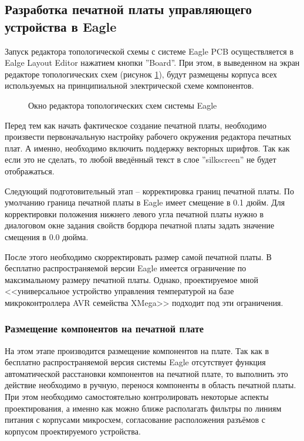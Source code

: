 \subsection{Разработка печатной платы управляющего устройства в Eagle}
Запуск редактора топологической схемы с системе Eagle PCB осуществляется в Ealge Layout Editor
нажатием кнопки ''Board''.  При этом, в выведенном на экран редакторе топологических
схем (рисунок \ref{img:boardEd}), будут размещены корпуса всех используемых на принципиальной
электрической схеме компонентов. 

\begin{figure}[h]
	\caption{Окно редактора топологических схем системы Eagle}
	\label{img:boardEd}
\end{figure}

Перед тем как начать фактическое создание печатной платы, необходимо произвести
первоначальную настройку рабочего окружения редактора печатных плат. А именно, необходимо
включить поддержку векторных шрифтов. Так как если это не сделать, то любой введённый текст в
слое ''silkscreen'' не будет отображаться.

Следующий подготовительный этап -- корректировка границ печатной платы. По умолчанию граница
печатной платы в Eagle имеет смещение в 0.1 дюйм. Для корректировки положения
нижнего левого угла печатной платы нужно в диалоговом окне задания свойств бордюра
печатной платы задать значение смещения в 0.0 дюйма.

После этого необходимо скорректировать размер самой печатной платы. В
бесплатно распространяемой версии Eagle имеется ограничение по максимальному размеру
печатной платы. Однако, проектируемое мной <<универсальное устройство управления
температурой на базе микроконтроллера AVR семейства XMega>> подходит под эти ограничения.

\subsubsection{Размещение компонентов на печатной плате}
На этом этапе производится размещение компонентов на плате. Так как в
бесплатно распространяемой версия системы Eagle отсутствует функция автоматической
расстановки компонентов на печатной плате, то выполнить это действие необходимо в ручную,
перенося компоненты в область печатной платы. При этом необходимо самостоятельно
контролировать некоторые аспекты проектирования, а именно как можно ближе располагать
фильтры по линиям питания с корпусами микросхем, согласование расположения разъёмов с
корпусом проектируемого устройства.

